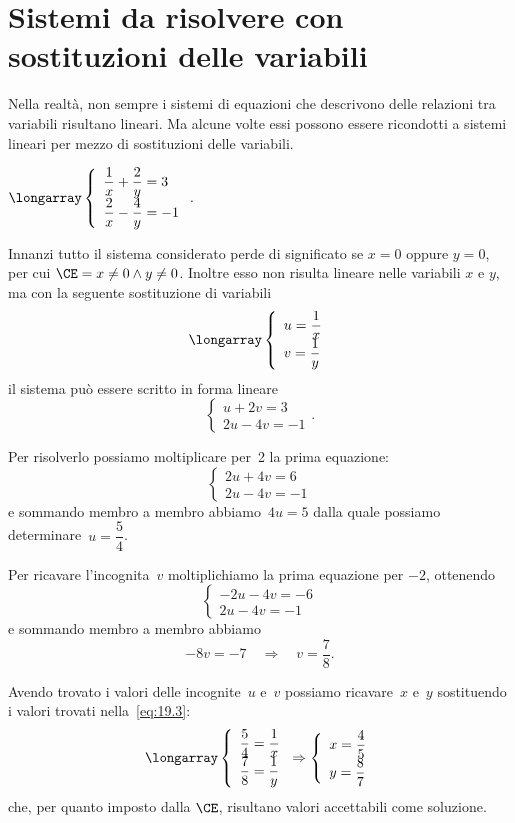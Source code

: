 \section{Sistemi da risolvere con sostituzioni delle variabili}

Nella realtà, non sempre i sistemi di equazioni che descrivono delle relazioni tra variabili risultano lineari. Ma alcune volte essi possono essere ricondotti a sistemi lineari per mezzo di
sostituzioni delle variabili.

\begin{exrig}
 \begin{esempio}
$\longarray\left\{\begin{array}{l}\dfrac{1}{x}+\dfrac{2}{y}=3\\\dfrac{2}{x}-\dfrac{4}{y}=-1 \end{array}\right..$

Innanzi tutto il sistema considerato perde di significato se $x=0$ oppure $y=0$, per cui $\CE = x\neq 0 \wedge y \neq 0$. Inoltre esso non risulta lineare nelle variabili $x$ e $y$, ma con la seguente sostituzione di variabili
\begin{align}
 \label{eq:19.3}
 \longarray\left\{\begin{array}{l}u=\dfrac{1}{x}\\v=\dfrac{1}{y}\end{array}\right.
\end{align}
il sistema può essere scritto in forma lineare
 \[\left\{\begin{array}{l}u+2v=3 \\2u-4v=-1 \end{array}\right..\]

Per risolverlo possiamo moltiplicare per~2 la prima equazione:
\[\left\{\begin{array}{l}2u+4v=6 \\2u-4v=-1
\end{array}\right.\]
e sommando membro a membro abbiamo~$4u=5$ dalla
quale possiamo determinare~$u=\dfrac{5}{4}$.

Per ricavare l'incognita~$v$ moltiplichiamo la prima equazione per $-2$, ottenendo
\[\left\{\begin{array}{l}-2u-4v=-6 \\2u-4v=-1 \end{array}\right.\]
e sommando membro a membro abbiamo
\[-8v=-7\quad\Rightarrow\quad v=\dfrac{7}{8}.\]

Avendo trovato i valori delle incognite~$u$ e~$v$ possiamo ricavare~$x$ e~$y$ sostituendo i valori trovati nella~\ref{eq:19.3}:
\[\longarray\left\{\begin{array}{l}\dfrac{5}{4}=\dfrac{1}{x}\\\dfrac{7}{8}=\dfrac{1}{y}\end{array}\right.\Rightarrow
\left\{\begin{array}{l}x=\dfrac{4}{5}\\y=\dfrac{8}{7}\end{array}\right.\]
che, per quanto imposto dalla $\CE$, risultano valori accettabili come soluzione.
 \end{esempio}
\end{exrig}

\ovalbox{\risolvii \ref{ese:19.66}, \ref{ese:19.67}, \ref{ese:19.68}}
\newpage

\cleardoublepage
